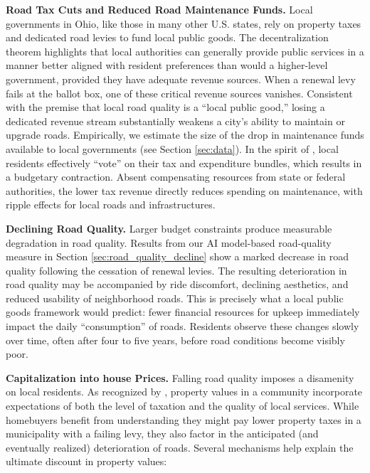 {\bf Road Tax Cuts and Reduced Road Maintenance Funds.} Local governments in Ohio, like those in many other U.S. states, rely on property taxes and dedicated road levies to fund local public goods. The \cite{Oates1972} decentralization theorem highlights that local authorities can generally provide public services in a manner better aligned with resident preferences than would a higher-level government, provided they have adequate revenue sources. When a renewal levy fails at the ballot box, one of these critical revenue sources vanishes. Consistent with the premise that local road quality is a “local public good,” losing a dedicated revenue stream substantially weakens a city’s ability to maintain or upgrade roads. Empirically, we estimate the size of the drop in maintenance funds available to local governments (see Section \ref{sec:data}). In the spirit of \cite{Tiebout1956}, local residents effectively “vote” on their tax and expenditure bundles, which results in a budgetary contraction. Absent compensating resources from state or federal authorities, the lower tax revenue directly reduces spending on maintenance, with ripple effects for local roads and infrastructures.

{\bf Declining Road Quality.} Larger budget constraints produce measurable degradation in road quality. Results from our AI model-based road-quality measure in Section \ref{sec:road_quality_decline} show a marked decrease in road quality following the cessation of renewal levies. The resulting deterioration in road quality may be accompanied by ride discomfort, declining aesthetics, and reduced usability of neighborhood roads. This is precisely what a local public goods framework would predict: fewer financial resources for upkeep immediately impact the daily “consumption” of roads. Residents observe these changes slowly over time, often after four to five years, before road conditions become visibly poor.

{\bf Capitalization into house Prices.} Falling road quality imposes a disamenity on local residents. As recognized by \cite{Oates1969}, property values in a community incorporate expectations of both the level of taxation and the quality of local services. While homebuyers benefit from understanding they might pay lower property taxes in a municipality with a failing levy, they also factor in the anticipated (and eventually realized) deterioration of roads. Several mechanisms help explain the ultimate discount in property values:

